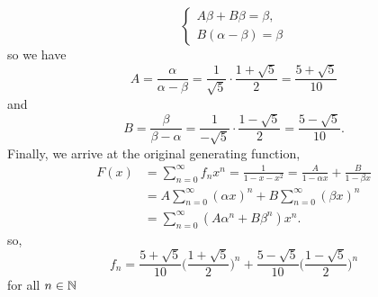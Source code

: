 \documentclass[11pt]{article}
\begin{document}
\begin{titlepage}
\begin{equation*}
\begin{cases}
	A\beta + B\beta = \beta,\\
	B(\alpha - \beta) = \beta
\end{cases}
\end{equation*}
so we have 
\begin{equation*}
	A = \frac{\alpha}{\alpha-\beta} = \frac{1}{\sqrt 5} \cdot
	\frac{1+\sqrt{5}}{2} = \frac{5+\sqrt 5}{10}
\end{equation*}
and 
\begin{equation*}
	B = \frac{\beta}{\beta - \alpha} = \frac{1}{-\sqrt 5} \cdot \frac{1-\sqrt
	5}{2} = \frac{5 - \sqrt 5}{10}.
\end{equation*}
Finally, we arrive at the original generating function,
\begin{align*}
	F(x) &= \sum^\infty_{n=0} f_nx^n = \frac{1}{1-x-x^2} = \frac{A}{1-\alpha x}
	+ \frac{B}{1-\beta x}\\
	&= A \sum^\infty_{n=0} (\alpha x)^n + B\sum^\infty_{n=0} (\beta x)^n
	\tag{by geometric series}\\
	&= \sum^\infty_{n=0} (A\alpha^n + B\beta^n)x^n.
\end{align*}
so,
\begin{equation*}
	f_n = \frac{5+\sqrt 5}{10}\bigg(\frac{1+\sqrt 5}{2}\bigg)^n +
	\frac{5-\sqrt 5}{10}\bigg(\frac{1-\sqrt 5}{2}\bigg)^n
\end{equation*}
for all $n\in\mathbb{N}$


\end{titlepage}
\end{document}
